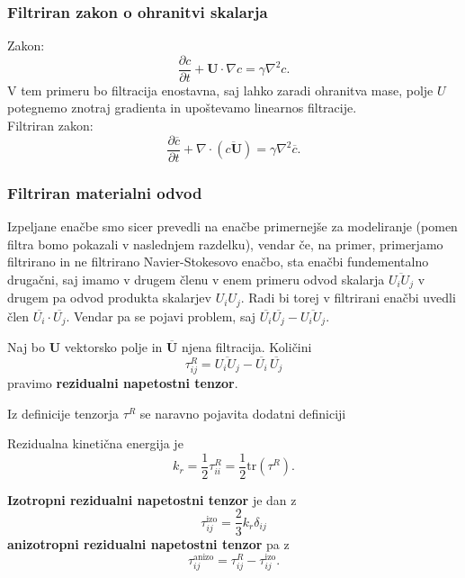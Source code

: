 \documentclass[mat2, tisk]{fmfdelo}
\newcommand{\bd}{\textbf}
\begin{document}
\subsubsection{Filtriran zakon o ohranitvi skalarja}

Zakon:
$$
\frac{\partial c}{\partial t} + \bd{U}\cdot\nabla c = \gamma \nabla^2 c.
$$
V tem primeru bo filtracija enostavna, saj lahko zaradi ohranitva mase, polje $U$ 
potegnemo znotraj gradienta in upoštevamo linearnos filtracije. \\
Filtriran zakon:
\begin{equation}
\frac{\partial \overline{c}}{\partial t} + \nabla \cdot (\overline{c\bd{U}}) = \gamma \nabla^2 \overline{c}.
\end{equation}

\subsubsection{Filtriran materialni odvod}

Izpeljane enačbe smo sicer prevedli na enačbe primernejše za modeliranje (pomen filtra bomo 
pokazali v naslednjem razdelku), vendar če, na primer, primerjamo filtrirano in 
ne filtrirano Navier-Stokesovo enačbo, sta enačbi fundementalno drugačni, saj imamo 
v drugem členu v enem primeru odvod skalarja $\overline{U_i U_j}$ v drugem pa odvod produkta 
skalarjev $U_i U_j$. Radi bi torej v filtrirani enačbi uvedli člen $\overline{U_i} \cdot \overline{U_j}$.
Vendar pa se pojavi problem, saj $\overline{U_i}\overline{U_j} - \overline{U_i U_j}$. 
\begin{definicija}
Naj bo $\bd{U}$ vektorsko polje in $\overline{\bd{U}}$ njena filtracija. Količini 
\begin{equation}
\tau_{ij}^R = \overline{U_i U_j} - \overline{U_i} \,\overline{U_j}
\end{equation}
pravimo \textbf{rezidualni napetostni tenzor}.
\end{definicija}

Iz definicije tenzorja $\tau^R$ se naravno pojavita dodatni definiciji
\begin{definicija}
Rezidualna kinetična energija je 
\begin{equation}
k_r = \frac{1}{2} \tau_{ii}^R = \frac{1}{2}\text{tr}(\tau^R).
\end{equation}
\end{definicija}

\begin{definicija}
\textbf{Izotropni rezidualni napetostni tenzor} je dan z 
\begin{equation}
\tau_{ij}^\text{izo} = \frac{2}{3} k_r \delta_{ij}
\end{equation}
\textbf{anizotropni rezidualni napetostni tenzor} pa z 
\begin{equation}
\tau_{ij}^\text{anizo} = \tau_{ij}^R - \tau_{ij}^\text{izo}.
\end{equation}
\end{definicija}
\end{document}
